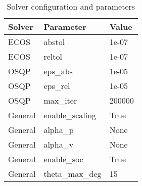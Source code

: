 \begin{table}[t]
\centering
\begin{tabular}{lll}
\toprule
Solver & Parameter & Value \\
\midrule
ECOS & abstol & 1e-07 \\
ECOS & reltol & 1e-07 \\
OSQP & eps_abs & 1e-05 \\
OSQP & eps_rel & 1e-05 \\
OSQP & max_iter & 200000 \\
General & enable_scaling & True \\
General & alpha_p & None \\
General & alpha_v & None \\
General & enable_soc & True \\
General & theta_max_deg & 15 \\
\bottomrule
\end{tabular}
\caption{Solver configuration and parameters}
\label{tab:solver_settings}
\end{table}
